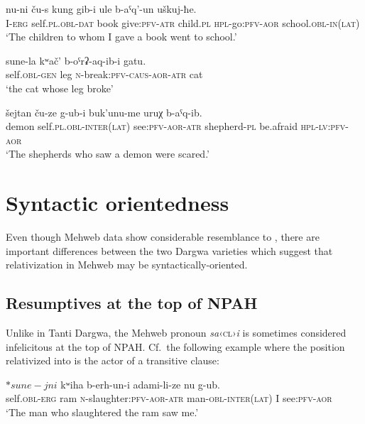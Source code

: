 ﻿\documentclass[output=paper]{langsci/langscibook}
\begin{document}
\ea \label{ex:11:13} %
\gll  nu-ni ču-s kung gib-i ule b-aˤq'-un uškuj-ħe.\\
I-\textsc{erg} self.\textsc{pl}.\textsc{obl}-\textsc{dat} book give:\textsc{pfv}-\textsc{atr} child.\textsc{pl} \textsc{hpl}-go:\textsc{pfv}-\textsc{aor} school.\textsc{obl}-\textsc{in}(\textsc{lat})\\
\glt `The children to whom I gave a book went to school.'

\ex \label{ex:11:14} %
\gll  sune-la kʷač' b-oˤrʡ-aq-ib-i gatu.\\
  self.\textsc{obl}-\textsc{gen} leg \textsc{n}-break:\textsc{pfv}-\textsc{caus}-\textsc{aor}-\textsc{atr}  cat\\
\glt  `the cat whose leg broke'

\ex \label{ex:11:15} %
\gll  šejtan ču-ze g-ub-i buk'unu-me uruχ b-aˤq-ib.\\
demon self.\textsc{pl}.\textsc{obl}-\textsc{inter}(\textsc{lat}) see:\textsc{pfv}-\textsc{aor}-\textsc{atr} shepherd-\textsc{pl} be.afraid \textsc{hpl}-\textsc{lv}:\textsc{pfv}-\textsc{aor}\\
\glt `The shepherds who saw a demon were scared.'
\z

\section{Syntactic orientedness}\label{syntactic-orientedness}

Even though Mehweb data show considerable resemblance to ,
there are important differences between the two Dargwa varieties which
suggest that relativization in Mehweb may be syntactically-oriented.

\subsection{Resumptives at the top of NPAH}


Unlike in Tanti Dargwa, the Mehweb pronoun
\emph{sa}‹\textsc{cl}›\emph{i} is sometimes considered infelicitous at
the top of NPAH. Cf.\ the following example where the position
relativized into is the actor of a transitive clause:

\ea \label{ex:11:16} %
\gll  \(*sune-jni\) kʷiha b-erh-un-i adami-li-ze nu g-ub.\\
  self.\textsc{obl}-\textsc{erg} ram \textsc{n}-slaughter:\textsc{pfv}-\textsc{aor}-\textsc{atr}  man-\textsc{obl}-\textsc{inter}(\textsc{lat}) I see:\textsc{pfv}-\textsc{aor}\\
\glt   `The man who slaughtered the ram saw me.'
\z
\end{document}
